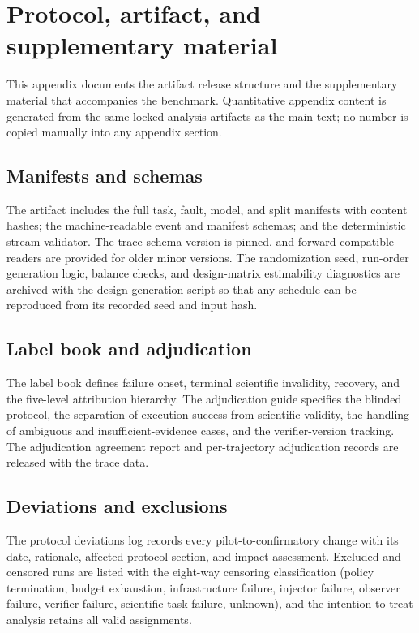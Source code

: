 \section{Protocol, artifact, and supplementary material}
\label{app:protocol}

This appendix documents the artifact release structure and the supplementary
material that accompanies the benchmark. Quantitative appendix content is
generated from the same locked analysis artifacts as the main text; no
number is copied manually into any appendix section.

\subsection{Manifests and schemas}

The artifact includes the full task, fault, model, and split manifests with
content hashes; the machine-readable event and manifest schemas; and the
deterministic stream validator. The trace schema version is pinned, and
forward-compatible readers are provided for older minor versions. The
randomization seed, run-order generation logic, balance checks, and
design-matrix estimability diagnostics are archived with the design-generation
script so that any schedule can be reproduced from its recorded seed and
input hash.

\subsection{Label book and adjudication}

The label book defines failure onset, terminal scientific invalidity,
recovery, and the five-level attribution hierarchy. The adjudication guide
specifies the blinded protocol, the separation of execution success from
scientific validity, the handling of ambiguous and insufficient-evidence
cases, and the verifier-version tracking. The adjudication agreement report
and per-trajectory adjudication records are released with the trace data.

\subsection{Deviations and exclusions}

The protocol deviations log records every pilot-to-confirmatory change with
its date, rationale, affected protocol section, and impact assessment.
Excluded and censored runs are listed with the eight-way censoring
classification (policy termination, budget exhaustion, infrastructure
failure, injector failure, observer failure, verifier failure, scientific
task failure, unknown), and the intention-to-treat analysis retains all
valid assignments.

